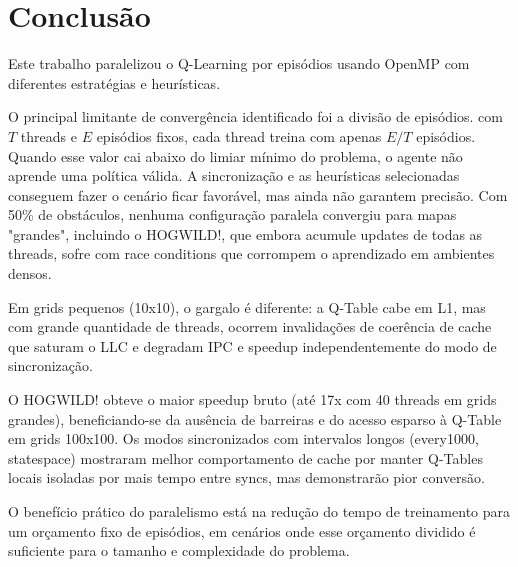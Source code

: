 \documentclass[12pt]{article}
\begin{document}
\section{Conclusão}
\label{sec:org32001cc}

Este trabalho paralelizou o Q-Learning por episódios usando OpenMP com
diferentes estratégias e heurísticas.

O principal limitante de convergência identificado foi a divisão de
episódios. com \(T\) threads e \(E\) episódios fixos, cada thread treina
com apenas \(E/T\) episódios. Quando esse valor cai abaixo do limiar
mínimo do problema, o agente não aprende uma política válida. A
sincronização e as heurísticas selecionadas conseguem fazer o cenário
ficar favorável, mas ainda não garantem precisão. Com 50\% de
obstáculos, nenhuma configuração paralela convergiu para mapas
"grandes", incluindo o HOGWILD!, que embora acumule updates de todas
as threads, sofre com race conditions que corrompem o aprendizado em
ambientes densos.

Em grids pequenos (10x10), o gargalo é diferente: a Q-Table cabe em
L1, mas com grande quantidade de threads, ocorrem invalidações de
coerência de cache que saturam o LLC e degradam IPC e speedup
independentemente do modo de sincronização.

O HOGWILD! obteve o maior speedup bruto (até 17x com 40 threads em
grids grandes), beneficiando-se da ausência de barreiras e do acesso
esparso à Q-Table em grids 100x100. Os modos sincronizados com
intervalos longos (every1000, statespace) mostraram
melhor comportamento de cache por manter Q-Tables locais isoladas por
mais tempo entre syncs, mas demonstrarão pior conversão.

O benefício prático do paralelismo está na redução do tempo de
treinamento para um orçamento fixo de episódios, em cenários onde esse
orçamento dividido é suficiente para o tamanho e complexidade do
problema.


\end{document}
